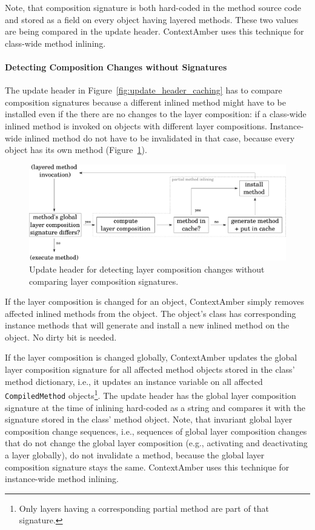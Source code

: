 \documentclass{sig-alternate}
\begin{document}
Note, that composition signature is both hard-coded in the method source code and stored as a field on every object having layered methods. These two values are being compared in the update header. ContextAmber uses this technique for class-wide method inlining.

\paragraph{Detecting Composition Changes without Signatures}
The update header in Figure~\ref{fig:update_header_caching} has to compare composition signatures because a different inlined method might have to be installed even if the there are no changes to the layer composition: if a class-wide inlined method is invoked on objects with different layer compositions. Instance-wide inlined method do not have to be invalidated in that case, because every object has its own method (Figure~\ref{fig:update_header_detecting}).

\begin{figure}[!htp]
    \centering
    \includegraphics[width=\columnwidth]{update_header_detecting.pdf}
    \caption{Update header for detecting layer composition changes without comparing layer composition signatures.}
    \label{fig:update_header_detecting}
\end{figure}

If the layer composition is changed for an object, ContextAmber simply removes affected inlined methods from the object. The object's class has corresponding instance methods that will generate and install a new inlined method on the object. No dirty bit is needed. 

If the layer composition is changed globally, ContextAmber updates the global layer composition signature for all affected method objects stored in the class' method dictionary, i.e., it updates an instance variable on all affected \texttt{CompiledMethod} objects\footnote{Only layers
having a corresponding partial method are part of that signature.}. The update header has the global layer composition signature at the time of inlining hard-coded as a string and compares it with the signature stored in the class' method object. Note, that invariant global layer composition change sequences, i.e., sequences of global layer composition changes that do not change the global layer composition (e.g., activating and deactivating a layer globally), do not invalidate a method, because the
global layer composition signature stays the same. ContextAmber uses this technique for instance-wide method inlining.
\end{document}
